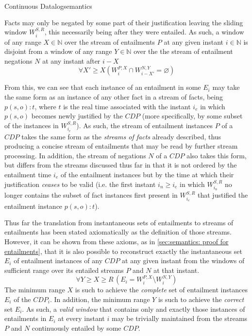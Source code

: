 \begin{nestedsection}{Continuous Datalog}{semantics}
\begin{axiom}
\label{axiom:continuous datalog: entailment precedes negation}
			Facts may only be negated by some part of their justification leaving the sliding window $W^{S,R}_{i}$, this necessarily being after they were entailed.
			As such, a window of any range ${X \in \mathbb{N}}$ over the stream of entailments $P$ at any given instant ${i \in \mathbb{N}}$ is disjoint from a window of any range ${Y \in \mathbb{N}}$ over the the stream of entailment negations $N$ at any instant after ${i - X}$
			\begin{equation*}
				\forall X' \geq X \left( W^{P,X}_{i} \cap W^{N,Y}_{i-X'} = \varnothing \right)
			\end{equation*}
\end{axiom}

	From this, we can see that each instance of an entailment in some $E_{i}$ may take the same form as an instance of any other fact in a stream of facts, being ${p(s,o):t}$, where $t$ is the real time associated with the instant $i_{e}$ in which ${p(s,o)}$ becomes newly justified by the ${CDP}$
	(more specifically, by some subset of the instances in $W^{S,R}_{i_{e}}$).
	As such, the stream of entailment instances $P$ of a ${CDP}$ takes the same form as the \emph{streams of facts} already described, thus producing a concise stream of entailments that may be read by further stream processing.
	In addition, the stream of negations $N$ of a ${CDP}$ also takes this form, but differs from the streams discussed thus far in that it is not ordered by the entailment time $i_{e}$ of the entailment instances but by the time at which their justification \emph{ceases} to be valid
	(i.e. the first instant ${i_{n} \geq i_{e}}$ in which $W^{S,R}_{i_{n}}$ no longer contains the subset of fact instances first present in $W^{S,R}_{i_{e}}$ that justified the entailment instance ${p(s,o):t}$).

	Thus far the translation from instantaneous sets of entailments to streams of entailments has been stated axiomatically as the definition of those streams.
	However, it can be shown from these axioms,
	as in \ref{sec:semantics: proof for entailments},
	that it is also possible to reconstruct exactly the instantaneous set $E_{i}$ of entailment instances of any ${CDP}$ at any given instant from the windows of sufficient range over its entailed streams $P$ and $N$ at that instant.
	\[ \forall Y \geq X \geq R \, \left( E_{i} = W^{P,X}_{i} \setminus W^{N,Y}_{i} \right) \]
	The minimum range $X$ is such to achieve the \emph{complete} set of entailment instances $E_{i}$ of the ${CDP}_{i}$.
	In addition, the minimum range $Y$ is such to achieve the \emph{correct} set $E_{i}$.
	As such, a \emph{valid window} that contains only and exactly those instances of entailments in $E_{i}$ at every instant $i$ may be trivially maintained from the streams $P$ and $N$ continuously entailed by some ${CDP}$.
\end{nestedsection}
